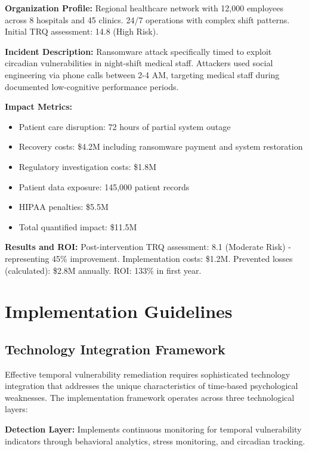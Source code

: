 \documentclass[11pt,a4paper]{article}
\begin{document}
\textbf{Organization Profile:} Regional healthcare network with 12,000 employees across 8 hospitals and 45 clinics. 24/7 operations with complex shift patterns. Initial TRQ assessment: 14.8 (High Risk).

\textbf{Incident Description:} Ransomware attack specifically timed to exploit circadian vulnerabilities in night-shift medical staff. Attackers used social engineering via phone calls between 2-4 AM, targeting medical staff during documented low-cognitive performance periods.

\textbf{Impact Metrics:}
\begin{itemize}
\item Patient care disruption: 72 hours of partial system outage
\item Recovery costs: \$4.2M including ransomware payment and system restoration
\item Regulatory investigation costs: \$1.8M
\item Patient data exposure: 145,000 patient records
\item HIPAA penalties: \$5.5M
\item Total quantified impact: \$11.5M
\end{itemize}

\textbf{Results and ROI:}
Post-intervention TRQ assessment: 8.1 (Moderate Risk) - representing 45\% improvement. Implementation costs: \$1.2M. Prevented losses (calculated): \$2.8M annually. ROI: 133\% in first year.

\section{Implementation Guidelines}

\subsection{Technology Integration Framework}

Effective temporal vulnerability remediation requires sophisticated technology integration that addresses the unique characteristics of time-based psychological weaknesses. The implementation framework operates across three technological layers:

\textbf{Detection Layer:} Implements continuous monitoring for temporal vulnerability indicators through behavioral analytics, stress monitoring, and circadian tracking.
\end{document}
